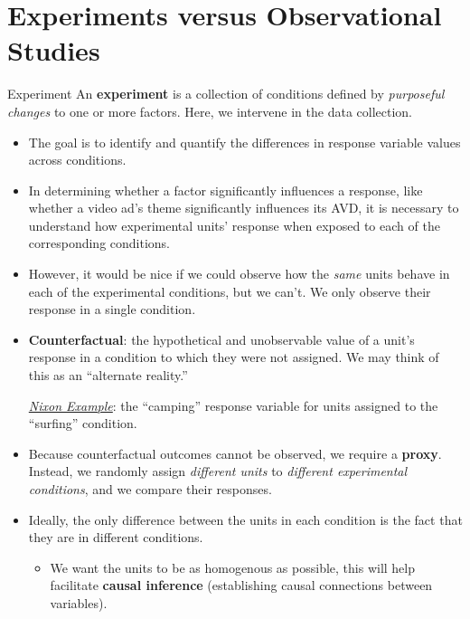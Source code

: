\section{Experiments versus Observational Studies}
\begin{Definition}{Experiment}{}
      An \textbf{experiment} is a collection of conditions defined by
      \emph{purposeful changes} to one or more factors. Here, we intervene in the data collection.
\end{Definition}
\begin{itemize}
      \item The goal is to identify and quantify the differences in response variable values
            across conditions.
      \item In determining whether a factor significantly influences a response,
            like whether a video ad's theme significantly influences its AVD, it is
            necessary to understand how experimental units' response when exposed to each
            of the corresponding conditions.
      \item However, it would be nice if we could observe how the \emph{same} units behave in
            each of the experimental conditions, but we can't. We only observe their response in a
            single condition.
      \item \textbf{Counterfactual}: the hypothetical and unobservable value of a unit's response
            in a condition to which they were not assigned. We may think of this
            as an ``alternate reality.''
            \begin{Example}{}{}
                  \emph{\hyperref[ex:nixon_ex]{Nixon Example}}: the ``camping'' response
                  variable for units assigned to the ``surfing'' condition.
            \end{Example}
      \item Because counterfactual outcomes cannot be observed, we require a \textbf{proxy}.
            Instead, we randomly assign \emph{different units} to \emph{different experimental
                  conditions},
            and we compare their responses.
      \item Ideally, the only difference between the units in each condition is the fact that
            they are in different conditions.
            \begin{itemize}
                  \item We want the units to be as homogenous as possible, this will help facilitate
                        \textbf{causal inference} (establishing causal connections between variables).

\end{itemize}
\end{itemize}

